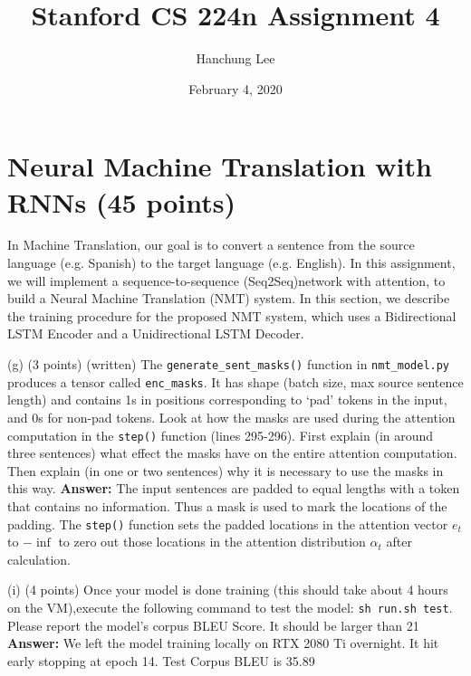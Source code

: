 \documentclass{article}
\title{Stanford CS 224n Assignment 4}
\author{Hanchung Lee}
\date{February 4, 2020}
\begin{document}
\maketitle
\section{Neural Machine Translation with RNNs (45 points)}
In Machine Translation, our goal is to convert a sentence from the source language (e.g.  Spanish) to the target language (e.g.  English). In this assignment, we will implement a sequence-to-sequence (Seq2Seq)network with attention, to build a Neural Machine Translation  (NMT)  system. In this  section, we describe the training procedure for the proposed NMT system, which uses a Bidirectional LSTM Encoder and a Unidirectional LSTM Decoder.

\bigbreak
(g)  (3 points)  (written) The \verb|generate_sent_masks()| function in \verb|nmt_model.py| produces a tensor called \verb|enc_masks|. It has shape (batch size, max source sentence length) and contains 1s in positions corresponding to ‘pad’ tokens in the input, and 0s for non-pad tokens.  Look at how the masks are used during the attention computation in the \verb|step()| function (lines 295-296). First explain (in around three sentences) what effect the masks have on the entire attention computation. Then explain (in one or two sentences) why it is necessary to use the masks in this way.
\smallbreak
\textbf{Answer:} The input sentences are padded to equal lengths with a token that contains no information. Thus a mask is used to mark the locations of the padding. The \verb|step()| function sets the padded locations in the attention vector $e_t$ to $-\inf$ to zero out those locations in the attention distribution $\alpha_t$ after calculation.

\bigbreak
(i) (4 points)  Once your model is done training (this should take about 4 hours on the VM),execute the following command to test the model: \verb|sh run.sh test|. Please report the model’s corpus BLEU Score.  It should be larger than 21
\smallbreak
\textbf{Answer:} We left the model training locally on RTX 2080 Ti overnight. It hit early stopping at epoch 14. Test Corpus BLEU is 35.89
\end{document}

